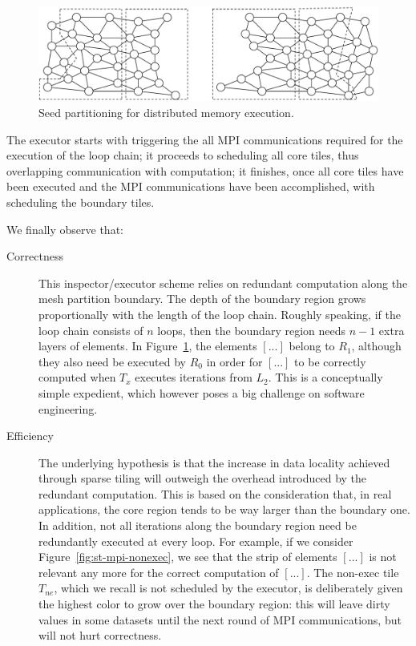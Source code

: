 \begin{figure}[h]
\centering
\includegraphics[width=\textwidth]{sparsetiling/figures/base_mesh_doppio.pdf}
\caption{Seed partitioning for distributed memory execution.}
\label{fig:st-mpi-init}
\end{figure}

The executor starts with triggering the all MPI communications required for the execution of the loop chain; it proceeds to scheduling all core tiles, thus overlapping communication with computation; it finishes, once all core tiles have been executed and the MPI communications have been accomplished, with scheduling the boundary tiles.

We finally observe that:
\begin{description}
\item[Correctness] This inspector/executor scheme relies on redundant computation along the mesh partition boundary. The depth of the boundary region grows proportionally with the length of the loop chain. Roughly speaking, if the loop chain consists of $n$ loops, then the boundary region needs $n-1$ extra layers of elements. In Figure~\ref{fig:st-mpi-init}, the elements $[...]$ belong to $R_1$, although they also need be executed by $R_0$ in order for $[...]$ to be correctly computed when $T_x$ executes iterations from $L_2$. This is a conceptually simple expedient, which however poses a big challenge on software engineering. 
\item[Efficiency] The underlying hypothesis is that the increase in data locality achieved through sparse tiling will outweigh the overhead introduced by the redundant computation. This is based on the consideration that, in real applications, the core region tends to be way larger than the boundary one. In addition, not all iterations along the boundary region need be redundantly executed at every loop. For example, if we consider Figure~\ref{fig:st-mpi-nonexec}, we see that the strip of elements $[...]$ is not relevant any more for the correct computation of $[...]$. The non-exec tile $T_{ne}$, which we recall is not scheduled by the executor, is deliberately given the highest color to grow over the boundary region: this will leave dirty values in some datasets until the next round of MPI communications, but will not hurt correctness. 
\end{description}



